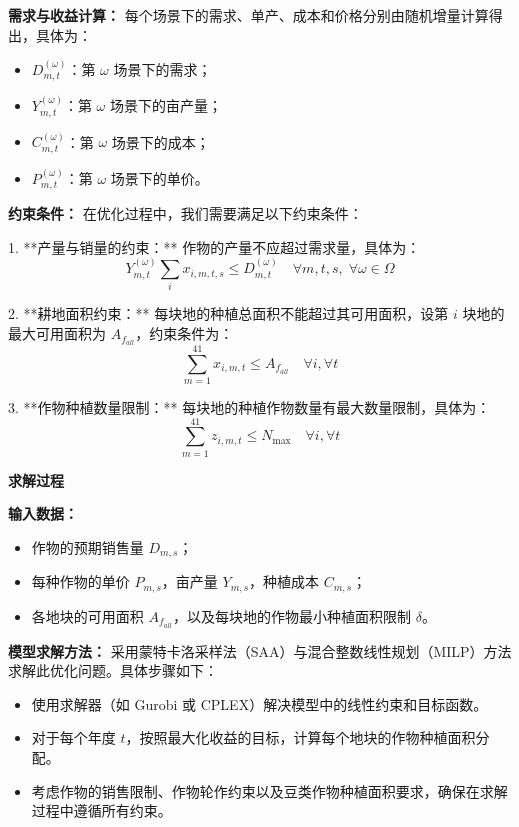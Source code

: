 \textbf{需求与收益计算：}  
每个场景下的需求、单产、成本和价格分别由随机增量计算得出，具体为：

\begin{itemize}
    \item $D_{m,t}^{(\omega)}$：第 $\omega$ 场景下的需求；
    \item $Y_{m,t}^{(\omega)}$：第 $\omega$ 场景下的亩产量；
    \item $C_{m,t}^{(\omega)}$：第 $\omega$ 场景下的成本；
    \item $P_{m,t}^{(\omega)}$：第 $\omega$ 场景下的单价。
\end{itemize}

\textbf{约束条件：}  
在优化过程中，我们需要满足以下约束条件：

1. **产量与销量的约束：**  
作物的产量不应超过需求量，具体为：
\begin{equation}
Y_{m,t}^{(\omega)}\sum_{i}x_{i,m,t,s} \leq D_{m,t}^{(\omega)} \quad \forall m,t,s,\;\forall \omega \in \Omega
\end{equation}

2. **耕地面积约束：**  
每块地的种植总面积不能超过其可用面积，设第 $i$ 块地的最大可用面积为 $A_{f_{all}}$，约束条件为：
\begin{equation}
\sum_{m=1}^{41} x_{i,m,t} \leq A_{f_{all}} \quad \forall i, \forall t
\end{equation}

3. **作物种植数量限制：**  
每块地的种植作物数量有最大数量限制，具体为：
\begin{equation}
\sum_{m=1}^{41} z_{i,m,t} \leq N_{\text{max}} \quad \forall i, \forall t
\end{equation}

\textbf{求解过程}

\textbf{输入数据：}  
\begin{itemize}
    \item 作物的预期销售量 $D_{m,s}$；
    \item 每种作物的单价 $P_{m,s}$，亩产量 $Y_{m,s}$，种植成本 $C_{m,s}$；
    \item 各地块的可用面积 $A_{f_{all}}$，以及每块地的作物最小种植面积限制 $\delta$。
\end{itemize}

\textbf{模型求解方法：}  
采用蒙特卡洛采样法（SAA）与混合整数线性规划（MILP）方法求解此优化问题。具体步骤如下：

\begin{itemize}
    \item 使用求解器（如 Gurobi 或 CPLEX）解决模型中的线性约束和目标函数。
    \item 对于每个年度 $t$，按照最大化收益的目标，计算每个地块的作物种植面积分配。
    \item 考虑作物的销售限制、作物轮作约束以及豆类作物种植面积要求，确保在求解过程中遵循所有约束。
\end{itemize}

